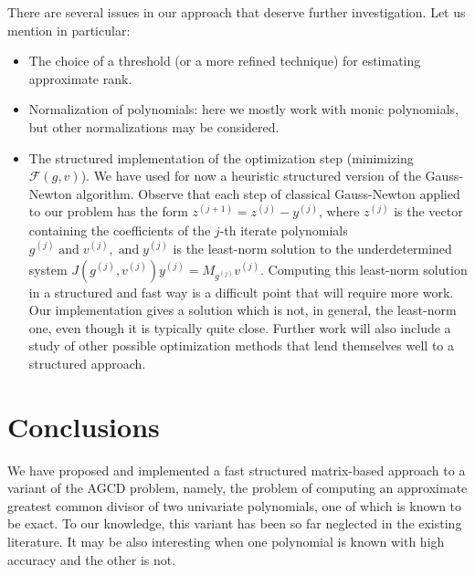 \documentclass{article}
\newcommand{\tmop}[1]{\ensuremath{\operatorname{#1}}}
\newenvironment{itemizedot}{\begin{itemize} \renewcommand{\labelitemi}{$\bullet$}\renewcommand{\labelitemii}{$\bullet$}\renewcommand{\labelitemiii}{$\bullet$}\renewcommand{\labelitemiv}{$\bullet$}}{\end{itemize}}
\begin{document}
There are several issues in our approach that deserve further investigation.
Let us mention in particular:
\begin{itemizedot}
  \item The choice of a threshold (or a more refined technique) for estimating
  approximate rank.
  
  \item Normalization of polynomials: here we mostly work with monic
  polynomials, but other normalizations may be considered.
  
  \item The structured implementation of the optimization step (minimizing
  $\mathcal{F}(g, v)$). We have used for now a heuristic structured version of
  the Gauss-Newton algorithm. Observe that each step of classical Gauss-Newton
  applied to our problem has the form $z^{(j + 1)}_{^{}} = z_{}^{(j)} -
  y^{(j)}_{}$, where $z^{(j)}$ is the vector containing the coefficients of
  the $j$-th iterate polynomials $g^{(j)} \tmop{and} v^{(j)}, \tmop{and}
  y_{}^{(j)}$ is the least-norm solution to the underdetermined system $J
  (g^{(j)}, v^{(j)}) y^{(j)} = M_{g^{(j)}} v^{(j)}$. Computing this least-norm
  solution in a structured and fast way is a difficult point that will require
  more work. Our implementation gives a solution which is not, in general, the
  least-norm one, even though it is typically quite close. Further work will
  also include a study of other possible optimization methods that lend
  themselves well to a structured approach.
  
  
\end{itemizedot}

\section{Conclusions}



We have proposed and implemented a fast structured matrix-based approach to a
variant of the AGCD problem, namely, the problem of computing an approximate
greatest common divisor of two univariate polynomials, one of which is known
to be exact. To our knowledge, this variant has been so far neglected in the
existing literature. It may be also interesting when one polynomial is known
with high accuracy and the other is not.
\end{document}
